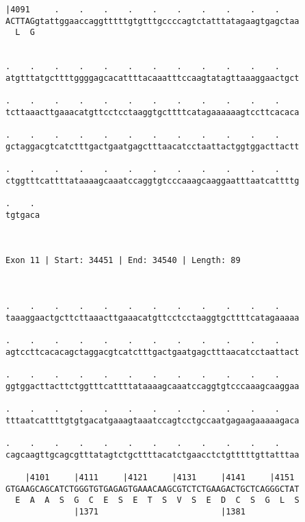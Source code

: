\documentclass{article}
\begin{document}
\begin{Verbatim}
|4091     .    .    .    .    .    .    .    .    .    .    
ACTTAGgtattggaaccaggtttttgtgtttgccccagtctatttatagaagtgagctaa
  L  G                                                      
                                                            
  
.    .    .    .    .    .    .    .    .    .    .    .    
atgtttatgcttttggggagcacattttacaaatttccaagtatagttaaaggaactgct
                                                            
.    .    .    .    .    .    .    .    .    .    .    .    
tcttaaacttgaaacatgttcctcctaaggtgcttttcatagaaaaaagtccttcacaca
                                                            
.    .    .    .    .    .    .    .    .    .    .    .    
gctaggacgtcatctttgactgaatgagctttaacatcctaattactggtggacttactt
                                                            
.    .    .    .    .    .    .    .    .    .    .    .    
ctggtttcattttataaaagcaaatccaggtgtcccaaagcaaggaatttaatcattttg
                                                            
.    . 
tgtgaca
       
       
 
Exon 11 | Start: 34451 | End: 34540 | Length: 89



.    .    .    .    .    .    .    .    .    .    .    .    
taaaggaactgcttcttaaacttgaaacatgttcctcctaaggtgcttttcatagaaaaa
                                                            
.    .    .    .    .    .    .    .    .    .    .    .    
agtccttcacacagctaggacgtcatctttgactgaatgagctttaacatcctaattact
                                                            
.    .    .    .    .    .    .    .    .    .    .    .    
ggtggacttacttctggtttcattttataaaagcaaatccaggtgtcccaaagcaaggaa
                                                            
.    .    .    .    .    .    .    .    .    .    .    .    
tttaatcattttgtgtgacatgaaagtaaatccagtcctgccaatgagaagaaaaagaca
                                                            
.    .    .    .    .    .    .    .    .    .    .    .    
cagcaagttgcagcgtttatagtctgcttttacatctgaacctctgtttttgttatttaa
                                                            
    |4101     |4111     |4121     |4131     |4141     |4151 
GTGAAGCAGCATCTGGGTGTGAGAGTGAAACAAGCGTCTCTGAAGACTGCTCAGGGCTAT
  E  A  A  S  G  C  E  S  E  T  S  V  S  E  D  C  S  G  L  S
              |1371                         |1381           
  

\end{Verbatim}
\end{document}
